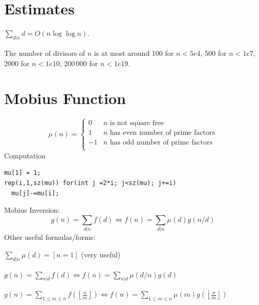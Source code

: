 \section{Estimates}
	$\sum_{d|n} d = O(n \log \log n)$.

	The number of divisors of $n$ is at most around 100 for $n < 5e4$, 500 for $n < 1e7$, 2000 for $n < 1e10$, 200\,000 for $n < 1e19$.

\section{Mobius Function}
\[
	\mu(n) = \begin{cases} 0 & n \textrm{ is not square free}\\ 1 & n \textrm{ has even number of prime factors}\\ -1 & n \textrm{ has odd number of prime factors}\\\end{cases}
\]
  Computation
  \begin{verbatim}
mu[1] = 1;
rep(i,1,sz(mu)) for(int j =2*i; j<sz(mu); j+=i)
  mu[j]-=mu[i];
  \end{verbatim}
  Mobius Inversion:
  \[ g(n) = \sum_{d|n} f(d) \Leftrightarrow f(n) = \sum_{d|n} \mu(d)g(n/d) \]
  Other useful formulas/forms:

  $ \sum_{d | n} \mu(d) = [ n = 1] $ (very useful)

  $ g(n) = \sum_{n|d} f(d) \Leftrightarrow f(n) = \sum_{n|d} \mu(d/n)g(d)$

 $ g(n) = \sum_{1 \leq m \leq n} f(\left\lfloor\frac{n}{m}\right \rfloor ) \Leftrightarrow f(n) = \sum_{1\leq m\leq n} \mu(m)g(\left\lfloor\frac{n}{m}\right\rfloor)$
